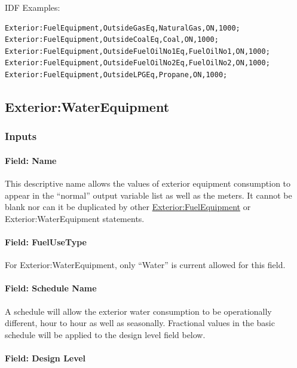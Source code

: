 IDF Examples:

\begin{lstlisting}
Exterior:FuelEquipment,OutsideGasEq,NaturalGas,ON,1000;
Exterior:FuelEquipment,OutsideCoalEq,Coal,ON,1000;
Exterior:FuelEquipment,OutsideFuelOilNo1Eq,FuelOilNo1,ON,1000;
Exterior:FuelEquipment,OutsideFuelOilNo2Eq,FuelOilNo2,ON,1000;
Exterior:FuelEquipment,OutsideLPGEq,Propane,ON,1000;
\end{lstlisting}

\subsection{Exterior:WaterEquipment}\label{exteriorwaterequipment}

\subsubsection{Inputs}\label{inputs-2-014}

\paragraph{Field: Name}\label{field-name-2-013}

This descriptive name allows the values of exterior equipment consumption to appear in the ``normal'' output variable list as well as the meters. It cannot be blank nor can it be duplicated by other \hyperref[exteriorfuelequipment]{Exterior:FuelEquipment} or Exterior:WaterEquipment statements.

\paragraph{Field: FuelUseType}\label{field-fuelusetype}

For Exterior:WaterEquipment, only ``Water'' is current allowed for this field.

\paragraph{Field: Schedule Name}\label{field-schedule-name-2-000}

A schedule will allow the exterior water consumption to be operationally different, hour to hour as well as seasonally. Fractional values in the basic schedule will be applied to the design level field below.

\paragraph{Field: Design Level}\label{field-design-level-2}

